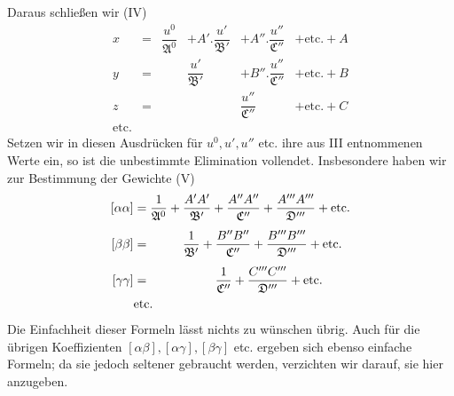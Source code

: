 Daraus schließen wir (IV)
\[
\begin{array}{rcllll}
x&=&\dfrac{u^0}{\mathfrak{A}^0}&+A'.\dfrac{u'}{\mathfrak{B}'}&+A''.\dfrac{u''}{\mathfrak{C}''}&+\text{etc.}+A\\[7pt]
y&=&&\dfrac{u'}{\mathfrak{B}'}&+B''.\dfrac{u''}{\mathfrak{C}''}&+\text{etc.}+B\\[7pt]
z&=&&&\dfrac{u''}{\mathfrak{C}''}&+\text{etc.}+C\\[4pt]
\text{etc.}
\end{array}
\]
Setzen wir in diesen Ausdrücken für \(u^0,u',u''\) etc. ihre aus III entnommenen Werte ein, so ist die unbestimmte Elimination vollendet. Insbesondere haben wir zur Bestimmung der Gewichte (V)
\[
\begin{aligned}
\relax[\alpha\alpha]&=\frac1{\mathfrak{A}^0}+\frac{A'A'}{\mathfrak{B}'}+\frac{A''A''}{\mathfrak{C}''}+\frac{A'''A'''}{\mathfrak{D}'''}+\text{etc.}\\[4pt]
[\beta\beta]&=\phantom{\frac1{\mathfrak{A}^0}+{}}\frac1{\mathfrak{B}'}+\frac{B''B''}{\mathfrak{C}''}+\frac{B'''B'''}{\mathfrak{D}'''}+\text{etc.}\\[4pt]
[\gamma\gamma]&=\phantom{\frac1{\mathfrak{A}^0}+\frac1{\mathfrak{B}'}+{}}\frac1{\mathfrak{C}''}+\frac{C'''C'''}{\mathfrak{D}'''}+\text{etc.}\\
&\text{etc.}
\end{aligned}
\]
Die Einfachheit dieser Formeln lässt nichts zu wünschen übrig. Auch für die übrigen
%
Koeffizienten \([\alpha\beta],[\alpha\gamma],[\beta\gamma]\) etc. ergeben sich ebenso einfache Formeln; da sie jedoch seltener gebraucht werden, verzichten wir darauf, sie hier anzugeben.

\clearpage
